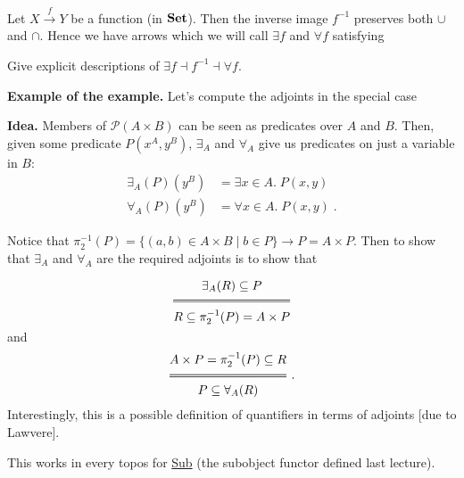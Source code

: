 \begin{example}
  Let $X \overset{f}\longrightarrow Y$ be a function (in $\mathbf {Set}$). Then the
  inverse image $f^{-1}$ preserves both $\cup$ and $\cap$. Hence we have arrows
  which we will call $\exists f$ and $\forall f$ satisfying
  \begin{center}
  \end{center}

  \begin{exercise}
    Give explicit descriptions of $\exists f \dashv f^{-1} \dashv \forall f$.
  \end{exercise}

  \textbf{Example of the example.} Let's compute the adjoints in the special case
  \begin{center}
  \end{center}

\textbf{Idea.} Members of $\mathcal P(A \times B)$ can be seen as predicates
over $A$ and $B$. Then, given some predicate $P(x^A, y^B)$, $\exists_A$ and
$\forall_A$ give us predicates on just a variable in $B$:
\begin{align*}
  \exists_A(P)(y^B) & = \exists x \in A.\; P(x, y) \\
  \forall_A(P)(y^B) & = \forall x \in A.\; P(x, y) \; .
\end{align*}

Notice that $\pi_2^{-1}(P) = \{(a, b) \in A \times B \;|\; b \in P\} \longrightarrow
P = A \times P$. Then to show that $\exists_A$ and $\forall_A$ are the required
adjoints is to show that

\[
  \Efrac{\exists_A(R) \subseteq P}{R \subseteq \pi_2^{-1}(P) = A \times P}
\]
and
\[
  \Efrac{A \times P = \pi_2^{-1}(P) \subseteq R}{P \subseteq \forall_A(R)}\;.
\]

Interestingly, this is a possible definition of quantifiers in terms of
adjoints [due to Lawvere].
\end{example}

\begin{remark}
 This works in every topos for \underline{Sub} (the subobject functor defined
 last lecture).
\end{remark}
